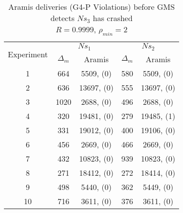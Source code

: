 \begin{table}[p]
    \begin{center}
        \renewcommand{\arraystretch}{1.25}
        \begin{tabular}{|c|c|c|c|c|}
            \hline
            \multirow{2}{*}{Experiment} & \multicolumn{2}{|c|}{$Ns_1$} & \multicolumn{2}{|c|}{$Ns_2$} \\ \cline{2-5}
                                                       & $\Delta_m$&\textsf{Aramis} & $\Delta_m$&\textsf{Aramis} \\ \hline \hline
            1 & 664 & 5509, (0) & 580 & 5509, (0) \\ \hline
            2 & 636 & 13697, (0) & 555 & 13697, (0) \\ \hline
            3 & 1020 & 2688, (0) & 496 & 2688, (0) \\ \hline
            4 & 320 & 19481, (0) & 279 & 19485, (1) \\ \hline
            5 & 331 & 19012, (0) & 400 & 19106, (0) \\ \hline
            6 & 456 & 2669, (0) & 466 & 2669, (0) \\ \hline
            7 & 432 & 10823, (0) & 939 & 10823, (0) \\ \hline
            8 & 271 & 18412, (0) & 272 & 18414, (0) \\ \hline
            9 & 498 & 5440, (0) & 362 & 5449, (0) \\ \hline
            10 & 716 & 3611, (0) & 376 & 3611, (0) \\ \hline
        \end{tabular}
        \caption[\textsf{Aramis} deliveries before GMS detects node crash ($R=0.9999$, $\rho_{min}=2$)]{\textsf{Aramis} deliveries (G4-P Violations) before GMS detects $Ns_3$ has crashed \\ $R=0.9999$, $\rho_{min}=2$}
        \label{table:crashed_node_rho2}
    \end{center}
\end{table}

